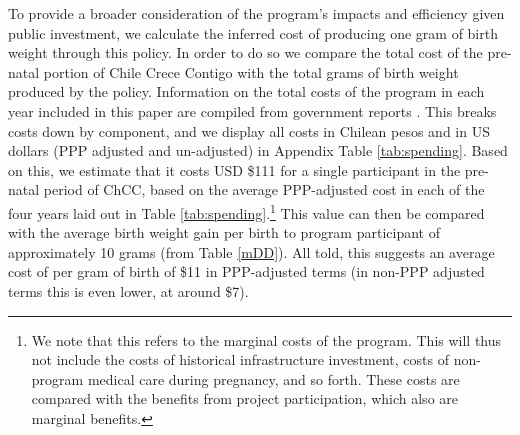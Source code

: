 \documentclass[12pt]{article}
\begin{document}
\begin{spacing}{1.4}
To provide a broader consideration of the program's impacts and
efficiency given public investment, we calculate the inferred
cost of producing one gram of birth weight through this policy.
In order to do so we compare the total cost of the pre-natal
portion of Chile Crece Contigo with the total grams of birth
weight produced by the policy.  Information on the total costs
of the program in each year included in this paper are compiled
from government reports \citep{Arrietetal2013}.  This breaks
costs down by component, and we display all costs in Chilean
pesos and in US dollars (PPP adjusted and un-adjusted) in Appendix
Table \ref{tab:spending}.  Based on this, we estimate that it
costs USD \$111 for a single participant in the pre-natal
period of ChCC, based on the average PPP-adjusted cost in each
of the four years laid out in Table \ref{tab:spending}.\footnote{
  We note that this refers to the marginal
  costs of the program.  This will thus not include the costs of
  historical infrastructure investment, costs of non-program
  medical care during pregnancy, and so forth.  These costs are
  compared with the benefits from project participation, which
  also are marginal benefits.}
This value can then be compared with the average birth weight gain
per birth to program participant of approximately 10 grams (from
Table \ref{mDD}).  All told, this suggests an average cost of
per gram of birth of \$11 in PPP-adjusted terms (in non-PPP
adjusted terms this is even lower, at around \$7).



\end{spacing}
\end{document}
